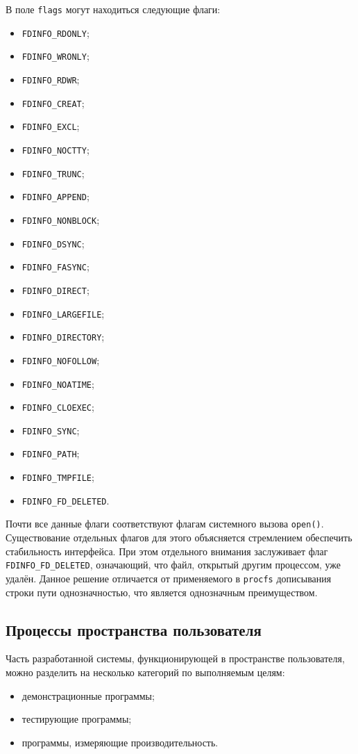 В поле \texttt{flags} могут находиться следующие флаги:
\begin{itemize}
\item \texttt{FDINFO\_RDONLY};
\item \texttt{FDINFO\_WRONLY};
\item \texttt{FDINFO\_RDWR};
\item \texttt{FDINFO\_CREAT}; 
\item \texttt{FDINFO\_EXCL};
\item \texttt{FDINFO\_NOCTTY};
\item \texttt{FDINFO\_TRUNC};
\item \texttt{FDINFO\_APPEND};
\item \texttt{FDINFO\_NONBLOCK};
\item \texttt{FDINFO\_DSYNC};
\item \texttt{FDINFO\_FASYNC};
\item \texttt{FDINFO\_DIRECT};
\item \texttt{FDINFO\_LARGEFILE};
\item \texttt{FDINFO\_DIRECTORY};
\item \texttt{FDINFO\_NOFOLLOW};
\item \texttt{FDINFO\_NOATIME};
\item \texttt{FDINFO\_CLOEXEC};
\item \texttt{FDINFO\_SYNC};
\item \texttt{FDINFO\_PATH};
\item \texttt{FDINFO\_TMPFILE};
\item \texttt{FDINFO\_FD\_DELETED}.
\end{itemize}

Почти все данные флаги соответствуют флагам системного вызова \texttt{open()}.
Существование отдельных флагов для этого объясняется стремлением обеспечить
стабильность интерфейса. При этом отдельного внимания заслуживает флаг
\texttt{FDINFO\_FD\_DELETED}, означающий, что файл, открытый другим процессом,
уже удалён. Данное решение отличается от применяемого в \texttt{procfs}
дописывания строки пути однозначностью, что является однозначным преимуществом.

\subsection{Процессы пространства пользователя}

Часть разработанной системы, функционирующей в пространстве пользователя, можно
разделить на несколько категорий по выполняемым целям:
\begin{itemize}
\item демонстрационные программы;
\item тестирующие программы;
\item программы, измеряющие производительность.
\end{itemize}

